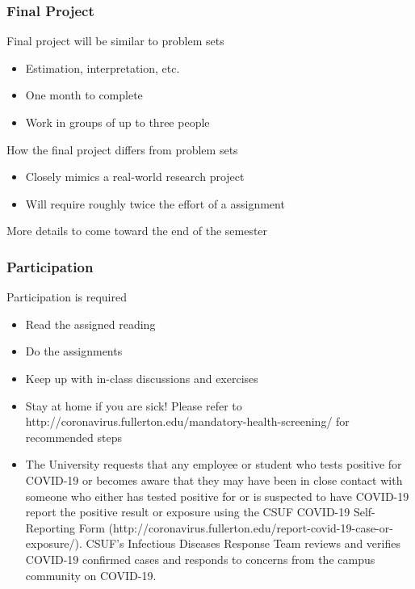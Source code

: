 \documentclass{beamer}
\begin{document}
\begin{frame}\frametitle{Final Project}
    Final project will be similar to problem sets
    \begin{itemize}
        \item Estimation, interpretation, etc.
        \item One month to complete
        \item Work in groups of up to three people
    \end{itemize}
    \vspace{2ex}
    How the final project differs from problem sets
    \begin{itemize}
        \item Closely mimics a real-world research project
        \item Will require roughly twice the effort of a assignment
    \end{itemize}
    \vspace{2ex}
    More details to come toward the end of the semester
\end{frame}

\begin{frame}\frametitle{Participation}
    Participation is required
    \begin{itemize}
        \item Read the assigned reading
        \item Do the assignments
        \item Keep up with in-class discussions and exercises
    \end{itemize}
    \begin{itemize}
        \item  Stay at home if you are sick! Please refer to http://coronavirus.fullerton.edu/mandatory-health-screening/ for recommended steps
        \item  The University requests that any employee or student who tests positive for COVID-19 or becomes aware that they may have been in close contact with someone who either has tested positive for or is suspected to have COVID-19 report the positive result or exposure using the CSUF COVID-19 Self-Reporting Form (http://coronavirus.fullerton.edu/report-covid-19-case-or-exposure/). CSUF’s Infectious Diseases Response Team reviews and verifies COVID-19 confirmed cases and responds to concerns from the campus community on COVID-19.
    \end{itemize}
\end{frame}
\end{document}
